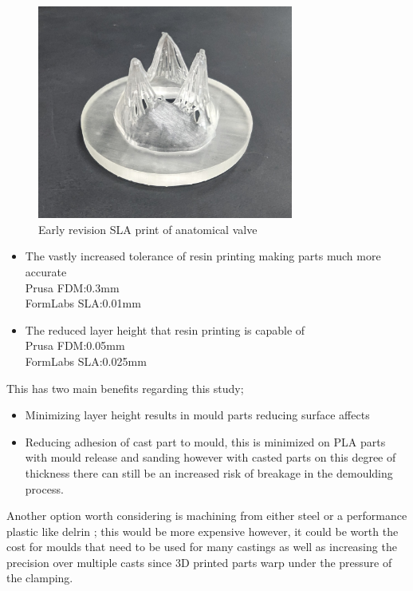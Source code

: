 \begin{figure}[H]
    \centering
    \includegraphics[width=0.75\textwidth]{figures/resinprintanat.jpg}
    \caption{Early revision SLA print of anatomical valve}
    \label{fig:reso}
\end{figure}
\begin{itemize}
    \item The vastly increased tolerance of resin printing making parts much more accurate\\
          Prusa \gls{FDM}:0.3mm\\
          FormLabs \gls{SLA}:0.01mm
    \item The reduced layer height that resin printing is capable of\\
          Prusa \gls{FDM}:0.05mm\\
          FormLabs \gls{SLA}:0.025mm
\end{itemize}
This has two main benefits regarding this study;
\begin{itemize}
    \item Minimizing layer height results in mould parts reducing surface affects
    \item Reducing adhesion of cast part to mould, this is minimized on \gls{PLA} parts with mould release and sanding however with casted parts on this degree of thickness there can still be an increased risk of breakage in the demoulding process.
\end{itemize}
Another option worth considering is machining from either steel or a performance plastic like delrin ; this would be more expensive however, it could be worth the cost for moulds that need to be used for many castings as well as increasing the precision over multiple casts since 3D printed parts warp under the pressure of the clamping.


